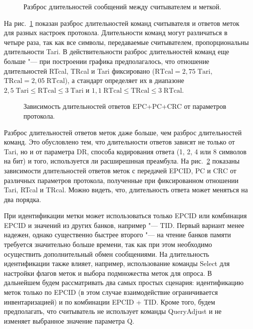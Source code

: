 \begin{figure}[h]
	\caption{Разброс длительностей сообщений между считывателем и меткой.}
	\label{fig:ch2_messages_durations}
\end{figure}

На рис.~\ref{fig:ch2_messages_durations} показан разброс длительностей команд считывателя и ответов меток для разных настроек протокола. Длительности команд могут различаться в четыре раза, так как все символы, передаваемые считывателем, пропорциональны длительности Tari. В действительности разброс длительностей команд еще больше "--- при построении графика предполагалось, что отношение длительностей RTcal, TRcal и Tari фиксировано ($\text{RTcal} = 2,75\;\text{Tari}$, $\text{TRcal} = 2,05\;\text{RTcal}$), а стандарт определяет их в диапазоне $2,5\;\text{Tari} \leqslant \text{RTcal} \leqslant 3\;\text{Tari}$ и $1,1\;\text{RTcal} \leqslant \text{TRcal} \leqslant 3\;\text{RTcal}$.

\begin{figure}[h]
	\caption{Зависимость длительностей ответов EPC+PC+CRC от параметров протокола.}
	\label{fig:ch2_response_durations}
\end{figure}

Разброс длительностей ответов меток даже больше, чем разброс длительностей команд. Это обусловлено тем, что длительности ответов зависят не только от Tari, но и от параметра DR, способа кодирования ответа (1, 2, 4 или 8 символов на бит) и того, используется ли расширешнная преамбула. На рис.~\ref{fig:ch2_response_durations} показаны зависимости длительностей ответов меток с передачей EPCID, PC и CRC от различных параметров протокола, полученные при фиксированном отношении Tari, RTcal и TRcal. Можно видеть, что, длительность ответа может меняться на два порядка.

При идентификации метки может использоваться только EPCID или комбинация EPCID и значений из других банков, например "--- TID. Первый вариант менее надежен, однако существенно быстрее второго "--- на чтение банков памяти требуется значительно больше времени, так как при этом необходимо осуществить дополнительный обмен сообщениями. На длительность идентификации также влияет, например, использование команды Select для настройки флагов меток и выбора подмножества меток для опроса. В дальнейшем будем рассматривать два самых простых сценария: идентификацию меток только по EPCID (в этом случае взаимодействие ограничивается инвентаризацией) и по комбинации EPCID + TID. Кроме того, будем предполагать, что считыватель не использует команды QueryAdjust и не изменяет выбранное значение параметра Q.

